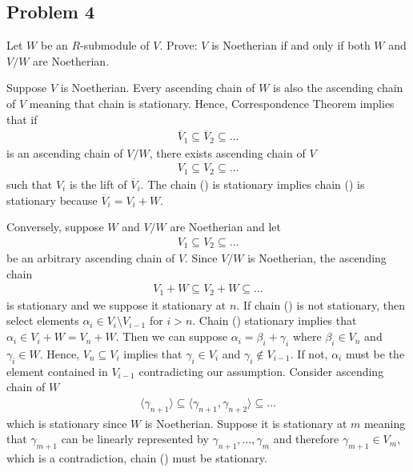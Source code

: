 \subsection*{Problem 4}
Let $W$ be an $R$-submodule of $V$. Prove: $V$ is Noetherian if and only if both $W$ and $V/W$ are Noetherian.
\begin{solution}
    Suppose $V$ is Noetherian. Every ascending chain of $W$ is also the ascending chain of $V$ meaning that chain is stationary. 
    Hence, Correspondence Theorem implies that if 
    \begin{align*}
        \overline{V}_1\subseteq \overline{V}_2\subseteq \dots  \tag{\Jupiter}
    \end{align*}
    is an ascending chain of $V/W$, there exists ascending chain of $V$
        \begin{align*}
        V_1\subseteq V_2\subseteq \dots \tag{\YinYang}
    \end{align*}
    such that $V_i$ is the lift of $\overline{V}_i$. The chain (\YinYang) is stationary implies chain (\Jupiter) is stationary because $\overline{V}_i = V_i+W$.

    Conversely, suppose $W$ and $V/W$ are Noetherian and let 
    \begin{align*}
        V_1\subseteq V_2\subseteq \dots \tag{\Gemini}
    \end{align*}
    be an arbitrary ascending chain of $V$. Since $V/W$ is Noetherian, the ascending chain 
    \begin{align*}
        V_1+W \subseteq V_2+W\subseteq \dots  \tag{\Scorpio}
    \end{align*}
    is stationary and we suppose it stationary at $n$. If chain (\Gemini) is not stationary, then select elements $\alpha_i\in V_i\setminus V_{i-1}$ for $i>n$.
    Chain (\Scorpio) stationary implies that $\alpha_i\in V_i+W = V_n+W$. Then we can suppose $\alpha_i = \beta_i+\gamma_i$ where $\beta_i\in V_n$ and $\gamma_i\in W$.
    Hence, $V_n\subseteq V_i$ implies that $\gamma_i\in V_{i}$ and $\gamma_i\notin V_{i-1}$. If not, $\alpha_i$ must be the element contained in $V_{i-1}$ contradicting our assumption.
    Consider ascending chain of $W$
    \begin{align*}
        \langle \gamma_{n+1} \rangle\subseteq \langle  \gamma_{n+1},\gamma_{n+2} \rangle \subseteq \dots
    \end{align*}
    which is stationary since $W$ is Noetherian. Suppose it is stationary at $m$ meaning that $\gamma_{m+1}$ can be linearly represented by $\gamma_{n+1},\dots,\gamma_{m}$
    and therefore $\gamma_{m+1}\in V_m$, which is a contradiction, chain (\Gemini) must be stationary.
\end{solution}


